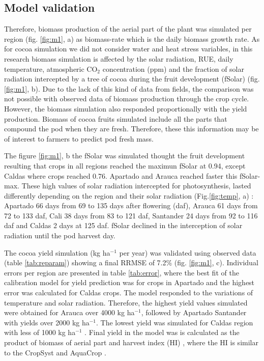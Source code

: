 \documentclass[gene,journal,article,submit,moreauthors,pdftex]{Definitions/mdpi}
\begin{document}
\subsection{Model validation}
Therefore, biomass production of the aerial part of the plant was simulated per region (fig. \ref{fig:m1}, a) as biomass-rate which is the daily biomass growth rate.  As for cocoa simulation we did not consider water and heat stress variables, in this research biomass simulation is affected by the solar radiation, RUE, daily temperature, atmospheric CO$_{2}$ concentration (ppm) and the fraction of solar radiation intercepted by a tree of cocoa during the fruit development (fSolar) (fig. \ref{fig:m1}, b). Due to the lack of this kind of data from fields, the comparison was not possible with observed data of biomass production through the crop cycle. However, the biomass simulation also responded proportionally with the yield production. Biomass of cocoa fruits simulated include all the parts that compound  the pod when they are fresh. Therefore, these this information may be of interest to farmers to predict pod fresh mass. 

The figure \ref{fig:m1}, b the fSolar was simulated thought the fruit development resulting that crops in  all regions reached the maximun fSolar at 0.94, except Caldas where crops reached 0.76.  Apartado and Arauca reached faster this fSolar-max. These high values of solar radiation intercepted for photosynthesis, lasted differently depending on the region and their solar radiation (Fig.\ref{fig:temp}, a) : Apartado 66 days  from  69 to 135 days after flowering (daf),  Arauca 61 days from 72 to 133 daf, Cali 38 days from 83 to 121 daf,  Santander 24 days from 92 to 116 daf and Caldas 2 days at 125 daf. fSolar declined in the interception of solar radiation until the pod harvest day. 

The cocoa yield simulation (kg ha$^{-1}$ per year) was validated using observed data (table \ref{tab:reparam}) showing a final RRMSE of 7.2\% (fig. \ref{fig:m1}, c). Individual errors per region are presented in table \ref{tab:error}, where the best fit of the calibration model  for yield prediction  was for crops in  Apartado and the highest error was calculated for Caldas crops.  The model responded to the variations of temperature and solar radiation. Therefore, the highest  yield values simulated were obtained for Arauca over 4000 kg ha$^{-1}$, followed by Apartado Santander with yields over 2000 kg ha$^{-1}$.  The lowest yield was simulated for Caldas region with less of 1000 kg ha$^{-1}$ . Final yield in the model was is calculated as the product of biomass of aerial part and harvest index (HI) \citep{Zao2019simple, Amir1991}, where the HI is similar to the CropSyst \citep{STOCKLE2003} and AquaCrop \cite{Steduto2009}. 
\end{document}
